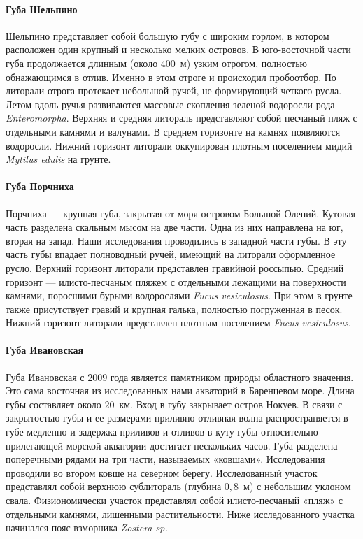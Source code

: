     \paragraph{Губа Шельпино}
Шельпино   представляет   собой   большую   губу   с   широким   горлом,   в   котором расположен   один   крупный   и   несколько   мелких   островов.   
В   юго-восточной   части   губа продолжается   длинным   (около   $400$~м)   узким   отрогом,   полностью   обнажающимся   в   отлив. 
Именно в этом отроге и происходил пробоотбор. 
По   литорали   отрога   протекает   небольшой   ручей,   не   формирующий   четкого   русла. 
Летом вдоль ручья развиваются массовые скопления зеленой водоросли рода  {\it Enteromorpha}. 
Верхняя и средняя литораль представляют собой песчаный пляж с отдельными камнями и валунами. 
В среднем горизонте на камнях появляются водоросли. 
Нижний горизонт литорали оккупирован плотным поселением мидий {\it Mytilus edulis} на грунте.

    \paragraph{Губа Порчниха}
Порчниха  ---  крупная   губа,   закрытая   от   моря   островом   Большой   Олений.   
Кутовая часть разделена скальным мысом на две части. 
Одна из них направлена на юг, вторая на запад. 
Наши   исследования   проводились   в   западной   части   губы.   
В   эту   часть   губы   впадает полноводный ручей, имеющий на литорали оформленное русло. 
Верхний горизонт литорали представлен   гравийной   россыпью.   
Средний   горизонт   ---   илисто-песчаным   пляжем   с отдельными   лежащими   на   поверхности   камнями,   поросшими   бурыми   водорослями  {\it Fucus vesiculosus}.   
При   этом   в   грунте   также   присутствует   гравий   и   крупная   галька,   полностью погруженная в песок. 
Нижний горизонт литорали представлен плотным поселением   {\it Fucus  vesiculosus}.

    \paragraph{Губа Ивановская}
Губа Ивановская с $2009$ года является памятником природы областного значения. 
Это сама восточная из исследованных нами акваторий в Баренцевом море. 
Длина губы составляет около $20$~км. 
Вход в губу закрывает  остров Нокуев.
В связи с  закрытостью губы и ее размерами приливно-отливная волна   распространяется   в   губе   медленно   и   задержка   приливов   и   отливов   в   куту   губы относительно прилегающей морской акватории достигает нескольких часов. 
Губа   разделена   поперечными   рядами   на   три   части,   называемых   «ковшами». 
Исследования   проводили   во   втором   ковше   на   северном   берегу.   
Исследованный   участок представлял   собой   верхнюю   сублитораль   (глубина   $0,8$~м)   с   небольшим   уклоном   свала. 
Физиономически участок представлял собой илисто-песчаный «пляж» с отдельными камнями, лишенными растительности. 
Ниже исследованного участка начинался пояс взморника {\it Zostera  sp.} 

